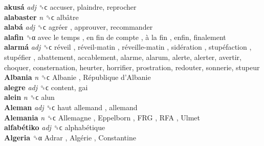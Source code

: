 \textbf{akusá} \emph{adj}  ␝ϲ  accuser, plaindre, reprocher  \\
\textbf{alabaster} \emph{n}  ␝ϲ   albâtre   \\
\textbf{alabá} \emph{adj}  ␝ϲ   agréer , approuver, recommander  \\
\textbf{alafin} ␝α   avec le temps ,  en fin de compte ,  à la fin , enfin, finalement  \\
\textbf{alarmá} \emph{adj}  ␝ϲ   réveil ,  réveil-matin ,  réveille-matin ,  sidération ,  stupéfaction ,  stupéfier , abattement, accablement, alarme, alarum, alerte, alerter, avertir, choquer, consternation, heurter, horrifier, prostration, redouter, sonnerie, stupeur  \\
\textbf{Albania} \emph{n}  ␝ϲ   Albanie ,  République d’Albanie   \\
\textbf{alegre} \emph{adj}  ␝ϲ  content, gai  \\
\textbf{alein} \emph{n}  ␝ϲ  alun  \\
\textbf{Aleman} \emph{adj}  ␝ϲ   haut allemand , allemand  \\
\textbf{Alemania} \emph{n}  ␝ϲ   Allemagne ,  Eppelborn ,  FRG ,  RFA ,  Ulmet   \\
\textbf{alfabétiko} \emph{adj}  ␝ϲ   alphabétique   \\
\textbf{Algeria} ␝α   Adrar ,  Algérie ,  Constantine   \\
